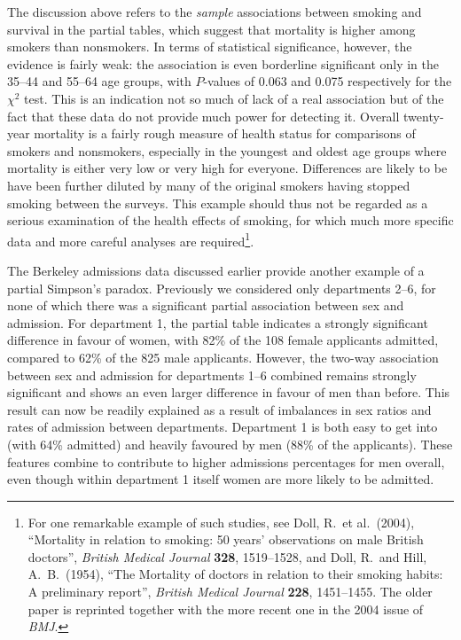 The discussion above refers to the \emph{sample} associations between smoking
and survival in the partial tables, which suggest that mortality is
higher among smokers than nonsmokers. In terms of statistical
significance, however, the evidence is fairly weak: the association is
even borderline significant only in the 35--44 and 55--64 age groups,
with $P$-values of 0.063 and 0.075 respectively for the $\chi^{2}$ test.
This is an indication not so much of lack of a real association but of
the fact that these data do not provide much power for detecting it.
Overall twenty-year mortality is a fairly rough measure of health status
for comparisons of smokers and nonsmokers, especially in the youngest
and oldest age groups where mortality is either very low or very high
for everyone. Differences are likely to be have been further diluted by
many of the original smokers having stopped smoking between the surveys.
This example should thus not be regarded as a serious examination of the
health effects of smoking, for which much more specific data and more
careful analyses are required\footnote{For one remarkable example of
such studies, see Doll, R.\ et al.\ (2004), ``Mortality in relation to
smoking: 50 years' observations on male British doctors'', \emph{British
Medical Journal} \textbf{328}, 1519--1528, and Doll, R.\ and Hill, A.\
B.\ (1954), ``The Mortality of doctors in relation to their smoking
habits: A preliminary report'', \emph{British Medical Journal}
\textbf{228}, 1451--1455. The older paper is reprinted
together with the more recent one
in the 2004 issue
of \emph{BMJ}.}.

The Berkeley admissions data discussed earlier provide another example of
a partial Simpson's paradox. Previously we considered only departments
2--6, for none of which there was a significant partial association
between sex and admission. For department 1, the partial table indicates
a strongly significant difference in favour of women, with 82\% of the
108 female applicants admitted, compared to 62\% of the 825 male
applicants. However, the two-way association between sex and admission
for departments 1--6 combined remains strongly significant and shows an
even larger difference in favour of men than before. This result can now
be readily explained as a result of imbalances in sex ratios and rates
of admission between departments. Department 1 is both easy to get into
(with 64\% admitted) and heavily favoured by men (88\% of the
applicants). These features combine to contribute to higher admissions
percentages for men overall, even though within department 1 itself
women are more likely to be admitted.

